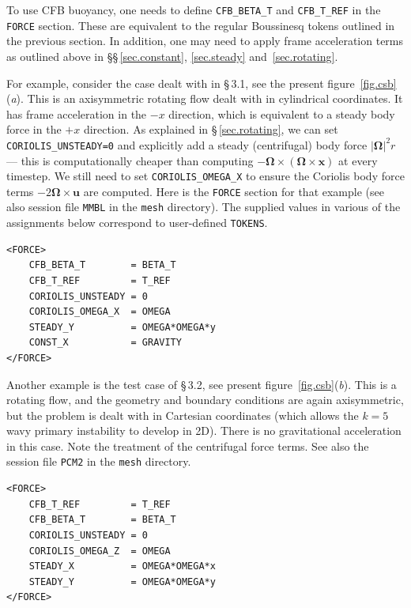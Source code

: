 \documentclass[11pt]{report}
\begin{document}
To use CFB buoyancy, one needs to define \verb|CFB_BETA_T| and
\verb|CFB_T_REF| in the \verb|FORCE| section.  These are equivalent to
the regular Boussinesq tokens outlined in the previous section. In
addition, one may need to apply frame acceleration terms as outlined
above in \S\S\,\ref{sec.constant}, \ref{sec.steady}
and~\ref{sec.rotating}.

For example, consider the case dealt with in \citet{blss21} \S\,3.1,
see the present figure~\ref{fig.csb}(\textit{a}).  This is an
axisymmetric rotating flow dealt with in cylindrical coordinates.  It
has frame acceleration in the $-x$ direction, which is equivalent to a
steady body force in the $+x$ direction.  As explained in
\S\,\ref{sec.rotating}, we can set \verb|CORIOLIS_UNSTEADY=0| and
explicitly add a steady (centrifugal) body force $|\bm{\Omega}|^2r$
--- this is computationally cheaper than computing
$-\bm{\Omega}\times(\bm{\Omega}\times\bm{x})$ at every timestep.  We
still need to set \verb|CORIOLIS_OMEGA_X| to ensure the Coriolis body
force terms $-2\bm{\Omega}\times\bm{u}$ are computed.  Here is the
\verb|FORCE| section for that example (see also session file
\verb|MMBL| in the \verb|mesh| directory).  The supplied values in
various of the assignments below correspond to user-defined
\verb|TOKENS|.

\begin{verbatim}
<FORCE>
    CFB_BETA_T        = BETA_T
    CFB_T_REF         = T_REF
    CORIOLIS_UNSTEADY = 0
    CORIOLIS_OMEGA_X  = OMEGA
    STEADY_Y          = OMEGA*OMEGA*y
    CONST_X           = GRAVITY
</FORCE>
\end{verbatim}

Another example is the test case of \citet{blss21} \S\,3.2, see
present figure~\ref{fig.csb}(\textit{b}).  This is a rotating flow,
and the geometry and boundary conditions are again axisymmetric, but
the problem is dealt with in Cartesian coordinates (which allows the
$k=5$ wavy primary instability to develop in 2D). There is no
gravitational acceleration in this case.  Note the treatment of the
centrifugal force terms.  See also the session file \verb|PCM2| in the
\verb|mesh| directory.

\begin{verbatim}
<FORCE>
    CFB_T_REF         = T_REF
    CFB_BETA_T        = BETA_T
    CORIOLIS_UNSTEADY = 0
    CORIOLIS_OMEGA_Z  = OMEGA
    STEADY_X          = OMEGA*OMEGA*x
    STEADY_Y          = OMEGA*OMEGA*y
</FORCE>
\end{verbatim}
\end{document}
